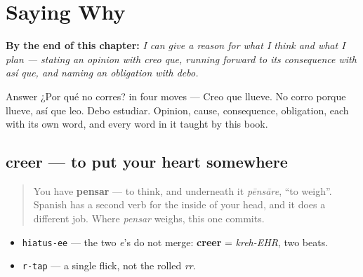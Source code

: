 
\chapter{Saying Why}
\label{ch:spanish-giving-reasons}

\begin{chapteropening}
\textbf{By the end of this chapter:} \emph{I can give a reason for what I think and what I plan — stating an opinion with creo que, running forward to its consequence with así que, and naming an obligation with debo.}

Answer ¿Por qué no corres? in four moves — Creo que llueve. No corro porque llueve, así que leo. Debo estudiar. Opinion, cause, consequence, obligation, each with its own word, and every word in it taught by this book.
\end{chapteropening}

\section[creer]{creer — to put your heart somewhere}

\label{lesson:ES-C39-creer}



\begin{quote}
You have \textbf{pensar} — to think, and underneath it \emph{pēnsāre}, \textquotedblleft{}to weigh\textquotedblright{}. Spanish has a second verb for the inside of your head, and it does a different job. Where \emph{pensar} weighs, this one commits.
\end{quote}

\begin{sounds}
\begin{itemize}
\raggedright
  \item \texttt{hiatus-ee} — the two \emph{e}'s do not merge: \textbf{creer} = \emph{kreh-EHR}, two beats.
  \item \texttt{r-tap} — a single flick, not the rolled \emph{rr}.
\end{itemize}
\end{sounds}

